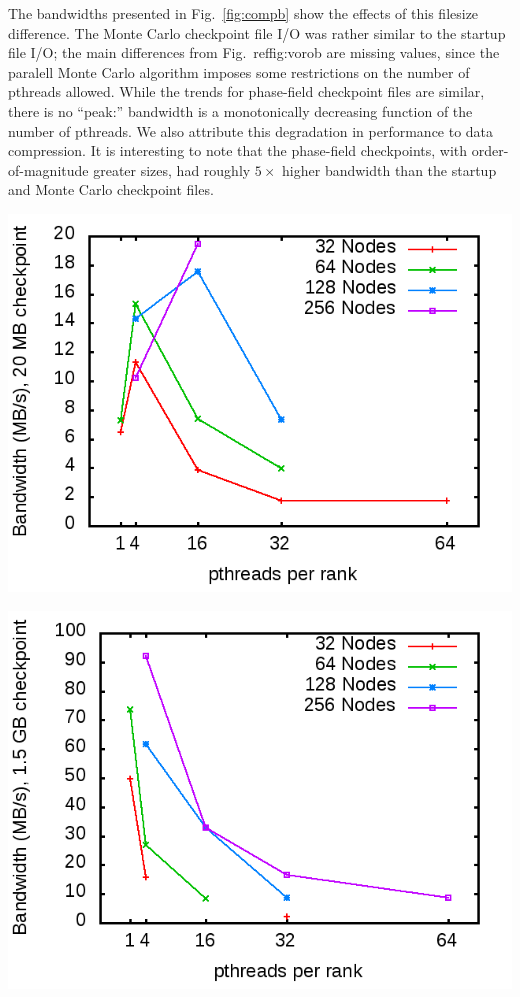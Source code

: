 \documentclass[11pt]{article}
\begin{document}
\begin{multicols*}{2}
The bandwidths presented in Fig.~\ref{fig:compb} show the effects of this filesize difference.
The Monte Carlo checkpoint file I/O was rather similar to the startup file I/O;
the main differences from Fig.~ref{fig:vorob} are missing values, since the paralell Monte Carlo algorithm imposes some restrictions on the number of pthreads allowed.
While the trends for phase-field checkpoint files are similar, there is no ``peak:'' 
bandwidth is a monotonically decreasing function of the number of pthreads.
We also attribute this degradation in performance to data compression.
It is interesting to note that the phase-field checkpoints, with order-of-magnitude greater sizes, had roughly $5\times$ higher bandwidth than the startup and Monte Carlo checkpoint files.
\baselineskip
\begin{center}
\begin{minipage}{0.4\textwidth}\centering
  \includegraphics[width=\textwidth]{img/prMC-compBW}

  \includegraphics[width=\textwidth]{img/pr-compBW}
\end{minipage}
\end{center}
\newpage


\end{multicols*}
\end{document}
